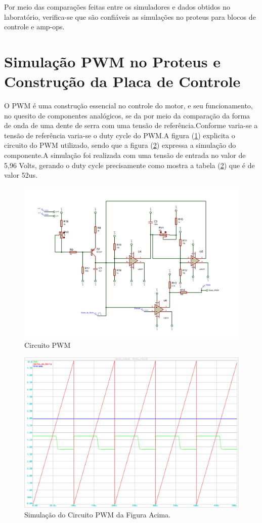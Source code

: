 \documentclass[11pt, a4paper, oneside]{article}
\begin{document}
Por meio das comparações feitas entre os simuladores e dados obtidos no laboratório, verifica-se que são confiáveis as simulações no proteus para blocos de controle e amp-ops.

\section{Simulação PWM no Proteus e Construção da Placa de Controle}
O PWM é uma construção essencial no controle do motor, e  seu funcionamento, no quesito de componentes analógicos, se da por meio da comparação da forma de onda de uma dente de serra com uma tensão de referência.Conforme varia-se a tensão de referência  varia-se o duty cycle do PWM.A figura (\ref{PWM}) explicita o circuito do PWM utilizado, sendo que a figura (\ref{Simulacao_PWM_Proteus1}) expressa a simulação do componente.A simulação foi realizada com uma tensão de entrada no valor de  5,96 Volts, gerando o duty cycle precisamente como mostra a tabela (\ref{Simulacao_PWM_Proteus1}) que é de valor 52us.

\begin{figure}[h!]
\centering
\includegraphics[width=.9\textwidth]{pwm.pdf}
\caption{Circuito PWM}
\label{PWM}
\end{figure}

\begin{figure}[h!]
\centering
\includegraphics[width=.5\textwidth]{simulacao_pwm_proteus.pdf}
\caption{Simulação do Circuito PWM da Figura Acima.}
\label{Simulacao_PWM_Proteus1}
\end{figure}
\end{document}
